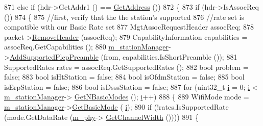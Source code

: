 \begin{DoxyCode}
871       \textcolor{keywordflow}{else} \textcolor{keywordflow}{if} (hdr->GetAddr1 () == \hyperlink{classns3_1_1RegularWifiMac_aea719a7d05fbc664c50479fc900777b7}{GetAddress} ())
872         \{
873           \textcolor{keywordflow}{if} (hdr->IsAssocReq ())
874             \{
875               \textcolor{comment}{//first, verify that the the station's supported}
876               \textcolor{comment}{//rate set is compatible with our Basic Rate set}
877               MgtAssocRequestHeader assocReq;
878               packet->\hyperlink{classns3_1_1Packet_a0961eccf975d75f902d40956c93ba63e}{RemoveHeader} (assocReq);
879               CapabilityInformation capabilities = assocReq.GetCapabilities ();
880               \hyperlink{classns3_1_1RegularWifiMac_a76d1a5e27b64bfe36f24a55d1eea2775}{m\_stationManager}->\hyperlink{classns3_1_1WifiRemoteStationManager_a87909d301ec356d94d625e41d7015e5a}{AddSupportedPlcpPreamble} (from, 
      capabilities.IsShortPreamble ());
881               SupportedRates rates = assocReq.GetSupportedRates ();
882               \textcolor{keywordtype}{bool} problem = \textcolor{keyword}{false};
883               \textcolor{keywordtype}{bool} isHtStation = \textcolor{keyword}{false};
884               \textcolor{keywordtype}{bool} isOfdmStation = \textcolor{keyword}{false};
885               \textcolor{keywordtype}{bool} isErpStation = \textcolor{keyword}{false};
886               \textcolor{keywordtype}{bool} isDsssStation = \textcolor{keyword}{false};
887               \textcolor{keywordflow}{for} (uint32\_t \hyperlink{bernuolliDistribution_8m_a6f6ccfcf58b31cb6412107d9d5281426}{i} = 0; \hyperlink{bernuolliDistribution_8m_a6f6ccfcf58b31cb6412107d9d5281426}{i} < \hyperlink{classns3_1_1RegularWifiMac_a76d1a5e27b64bfe36f24a55d1eea2775}{m\_stationManager}->
      \hyperlink{classns3_1_1WifiRemoteStationManager_a1528f837dd70f82cda248f1434b94357}{GetNBasicModes} (); \hyperlink{bernuolliDistribution_8m_a6f6ccfcf58b31cb6412107d9d5281426}{i}++)
888                 \{
889                   WifiMode mode = \hyperlink{classns3_1_1RegularWifiMac_a76d1a5e27b64bfe36f24a55d1eea2775}{m\_stationManager}->\hyperlink{classns3_1_1WifiRemoteStationManager_a8e4599eafc71fa98f6869e3d8908ea24}{GetBasicMode} (
      \hyperlink{bernuolliDistribution_8m_a6f6ccfcf58b31cb6412107d9d5281426}{i});
890                   \textcolor{keywordflow}{if} (!rates.IsSupportedRate (mode.GetDataRate (\hyperlink{classns3_1_1RegularWifiMac_a1a6dad8eb0a057a4e1b459f518457a4c}{m\_phy}->
      \hyperlink{classns3_1_1WifiPhy_a4a5d5009b3b3308f2baeed42a2007189}{GetChannelWidth} ())))
891                     \{

\end{DoxyCode}
